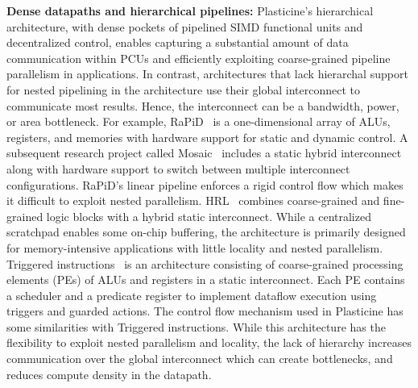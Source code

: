 { \bf Dense datapaths and hierarchical pipelines:} Plasticine's hierarchical architecture, with dense pockets of pipelined SIMD functional units and decentralized control,
enables capturing a substantial amount of data communication within PCUs and efficiently exploiting coarse-grained pipeline parallelism in applications.
In contrast, architectures that lack hierarchal support for nested pipelining in the architecture use their global interconnect to communicate most results.
Hence, the interconnect can be a bandwidth, power, or area bottleneck.
For example, RaPiD~\cite{rapid} is a one-dimensional array of ALUs, registers, and memories with hardware support for static and dynamic control.
A subsequent research project called Mosaic~\cite{staticVsScheduled} includes a static hybrid interconnect along with hardware support to switch
between multiple interconnect configurations. RaPiD's linear pipeline enforces a rigid control flow which makes it difficult to exploit nested parallelism.
HRL~\cite{hrl} combines coarse-grained and fine-grained logic blocks with a hybrid static interconnect. While a centralized scratchpad enables some on-chip buffering,
the architecture is primarily designed for memory-intensive applications with little locality and nested parallelism.
Triggered instructions~\cite{ti} is an architecture consisting of coarse-grained processing elements (PEs) of ALUs and registers in a static interconnect.
Each PE contains a scheduler and a predicate register to implement dataflow execution using triggers and guarded actions. The control flow mechanism used in Plasticine
has some similarities with Triggered instructions. While this architecture has the flexibility to exploit nested parallelism and locality, the lack of hierarchy increases
communication over the global interconnect which can create bottlenecks, and reduces compute density in the datapath.


